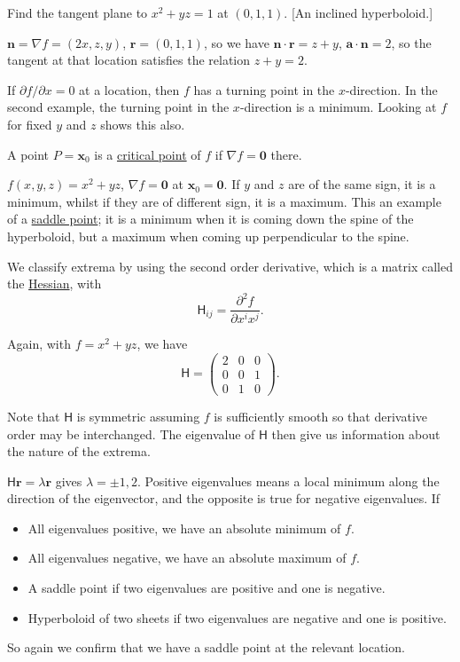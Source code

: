 \documentclass[10pt,notitlepage]{revtex4-1}
\newenvironment{example}[1][Example]{\begin{trivlist}
\item[\hskip \labelsep {\bfseries #1}]}{\end{trivlist}}
\newcommand{\dy}{\partial}
\newcommand{\ddy}[2]{\frac{\dy#1}{\dy#2}}
\newcommand{\grad}{\nabla}
\newcommand{\xb}{\boldsymbol{x}}
\newcommand{\ab}{{\boldsymbol{a}}}
\newcommand{\nb}{{\boldsymbol{n}}}
\begin{document}
\begin{example}
	Find the tangent plane to $x^2+yz=1$ at $(0,1,1)$. [An inclined
	hyperboloid.]
	
	$\nb=\grad f=(2x,z,y)$, $\boldsymbol{r}=(0,1,1)$, so we have
	$\nb\cdot\boldsymbol{r}=z+y$, $\ab\cdot\nb=2$, so the tangent at that
	location satisfies the relation $z+y=2$.
\end{example}
If $\dy f/\dy x=0$ at a location, then $f$ has a turning point in the
$x$-direction. In the second example, the turning point in the $x$-direction is
a minimum. Looking at $f$ for fixed $y$ and $z$ shows this also.

A point $P=\xb_0$ is a \underline{critical point} of $f$ if $\grad
f=\boldsymbol{0}$ there.
\begin{example}
	$f(x,y,z)=x^2+yz$, $\grad f=\boldsymbol{0}$ at $\xb_0=\boldsymbol{0}$. If
	$y$ and $z$ are of the same sign, it is a minimum, whilst if they are of
	different sign, it is a maximum. This an example of a \underline{saddle
	point}; it is a minimum when it is coming down the spine of the hyperboloid,
	but a maximum when coming up perpendicular to the spine.
\end{example}

We classify extrema by using the second order derivative, which is a matrix
called the \underline{Hessian}, with
\begin{equation}
	\mathsf{H}_{ij}=\ddy{^2 f}{x^i x^j}.
\end{equation}
\begin{example}
	Again, with $f=x^2+yz$, we have
	\begin{equation}
		\mathsf{H}=\begin{pmatrix}2&0&0\\0&0&1\\0&1&0\end{pmatrix}.
	\end{equation}
\end{example}
Note that $\mathsf{H}$ is symmetric assuming $f$ is sufficiently smooth so that
derivative order may be interchanged. The eigenvalue of $\mathsf{H}$ then give
us information about the nature of the extrema.
\begin{example}
	$\mathsf{H}\boldsymbol{r}=\lambda\boldsymbol{r}$ gives $\lambda=\pm1,2$.
	Positive eigenvalues means a local minimum along the direction of the
	eigenvector, and the opposite is true for negative eigenvalues. If
	\begin{itemize}
		\item All eigenvalues positive, we have an absolute minimum of $f$.
		\item All eigenvalues negative, we have an absolute maximum of $f$.
		\item A saddle point if two eigenvalues are positive and one is
		negative.
		\item Hyperboloid of two sheets if two eigenvalues are negative and one
		is positive.
	\end{itemize}
	So again we confirm that we have a saddle point at the relevant location.
\end{example}
\end{document}
